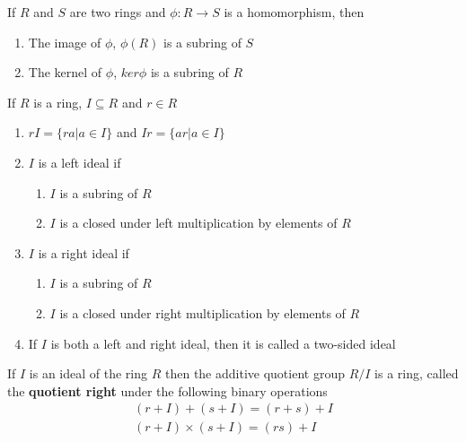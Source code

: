 \documentclass[titlepage, 12pt]{book}
\begin{document}
\begin{proposition}{}{}
    If $R$ and $S$ are two rings and $\phi:R\rightarrow S$ is a homomorphism,
    then
    \begin{enumerate}
        \item The image of $\phi$, $\phi(R)$ is a subring of $S$
        \item The kernel of $\phi$, $ker\phi$ is a subring of $R$
    \end{enumerate}
\end{proposition}

\begin{definition}
    If $R$ is a ring, $I\subseteq R$ and $r\in R$
    \begin{enumerate}
        \item $rI = \{ra|a\in I\}$ and $Ir = \{ar|a\in I\}$
        \item $I$ is a left ideal if
            \begin{enumerate}
                \item $I$ is a subring of $R$
                \item $I$ is a closed under left multiplication by elements of $R$
            \end{enumerate}
        \item $I$ is a right ideal if
            \begin{enumerate}
                \item $I$ is a subring of $R$
                \item $I$ is a closed under right multiplication by elements of $R$
            \end{enumerate}
        \item If $I$ is both a left and right ideal, then it is called a
            two-sided ideal
    \end{enumerate}
\end{definition}

\begin{proposition}{}{}
    If $I$ is an ideal of the ring $R$ then the additive quotient group $R/I$ is
    a ring, called the \textbf{quotient right} under the following binary
    operations
    \begin{gather*}
        (r + I) + (s + I) = (r + s) + I\\
        (r + I) \times (s + I) = (rs) + I\\
    \end{gather*}
\end{proposition}
\end{document}
